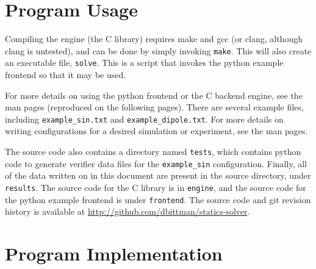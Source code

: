 \documentclass[12pt]{article}
\begin{document}
\clearpage
\begin{appendices}
\section{Program Usage}

Compiling the engine (the C library) requires make and gcc (or clang, although clang is untested), and can
be done by simply invoking \texttt{make}. This will also create an executable file, \texttt{solve}. This
is a script that invokes the python example frontend so that it may be used.

For more details on using the python frontend or the C backend engine, see the man pages (reproduced on the
following pages). There are several example files, including \texttt{example\_sin.txt} and \texttt{example\_dipole.txt}.
For more details on writing configurations for a desired simulation or experiment, see the man pages.

The source code also contains a directory named \texttt{tests}, which contains python code to generate verifier data
files for the \texttt{example\_sin} configuration. Finally, all of the data written on in this document are present
in the source directory, under \texttt{results}. The source code for the C library is in \texttt{engine}, and the
source code for the python example frontend is under \texttt{frontend}. The source code and git revision history
is available at \url{http://github.com/dbittman/statics-solver}.

%
%
\clearpage



\section{Program Implementation}
\label{app:des}



\end{appendices}

\clearpage



\end{document}
